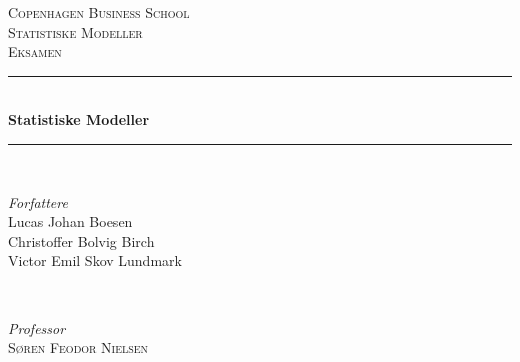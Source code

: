 \documentclass[11pt,a4paper]{article}
\begin{document}
\begin{titlepage} %
	\newcommand{\HRule}{\rule{\linewidth}{0.5mm}} %
	
	\center %
	
	
	\textsc{\LARGE Copenhagen Business School}\\[1.5cm] %
	
	\textsc{\Large Statistiske Modeller}\\[0.5cm] %
	
	\textsc{\large Eksamen}\\[0.5cm] %
	
	
	\HRule\\[0.4cm]
	
	{\huge\bfseries Statistiske Modeller}\\[0.4cm] %
	
	\HRule\\[1.5cm]
	
	
	\begin{minipage}{0.4\textwidth}
		\begin{flushleft}
			\large
			\textit{Forfattere}\\
			Lucas Johan Boesen\\ %
			Christoffer Bolvig Birch\\ %
			Victor Emil Skov Lundmark\\ %
		\end{flushleft}
	\end{minipage}
	~
	\begin{minipage}{0.4\textwidth}
		\begin{flushright}
			\large
			\textit{Professor}\\
			\textsc{Søren Feodor Nielsen}\\
			\textsc{}\\
			\textsc{}\\%
		\end{flushright}
	\end{minipage}
	

\end{titlepage}
\end{document}
